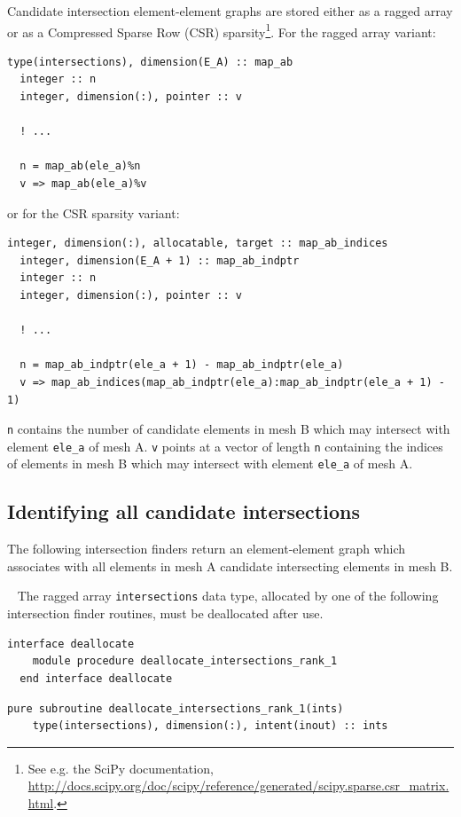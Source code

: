 \documentclass{article}
\begin{document}
Candidate intersection element-element graphs are stored either as a ragged
array or as a Compressed Sparse Row (CSR) sparsity\footnote{See e.g. the SciPy
documentation,
\url{http://docs.scipy.org/doc/scipy/reference/generated/scipy.sparse.csr_matrix.html}.}.
For the ragged array variant:
\begin{lstlisting}[language=FORTRAN]
  type(intersections), dimension(E_A) :: map_ab
  integer :: n
  integer, dimension(:), pointer :: v
  
  ! ...

  n = map_ab(ele_a)%n
  v => map_ab(ele_a)%v
\end{lstlisting}
or for the CSR sparsity variant:
\begin{lstlisting}[language=FORTRAN]
  integer, dimension(:), allocatable, target :: map_ab_indices
  integer, dimension(E_A + 1) :: map_ab_indptr
  integer :: n
  integer, dimension(:), pointer :: v
  
  ! ...

  n = map_ab_indptr(ele_a + 1) - map_ab_indptr(ele_a)
  v => map_ab_indices(map_ab_indptr(ele_a):map_ab_indptr(ele_a + 1) - 1)
\end{lstlisting}
\verb+n+ contains the number of candidate elements in mesh B which may intersect
with element \verb+ele_a+ of mesh A. \verb+v+ points at a vector of length
\verb+n+ containing the indices of elements in mesh B which may intersect with
element \verb+ele_a+ of mesh A.

\subsection{Identifying all candidate intersections}

The following intersection finders return an element-element graph which
associates with all elements in mesh A candidate intersecting elements in mesh
B. 

~\newline
The ragged array \verb+intersections+ data type, allocated by one of the
following intersection finder routines, must be deallocated after use.

\begin{lstlisting}[language=FORTRAN]
  interface deallocate
    module procedure deallocate_intersections_rank_1
  end interface deallocate
\end{lstlisting}

\begin{lstlisting}[language=FORTRAN]
  pure subroutine deallocate_intersections_rank_1(ints)
    type(intersections), dimension(:), intent(inout) :: ints
\end{lstlisting}
\end{document}
